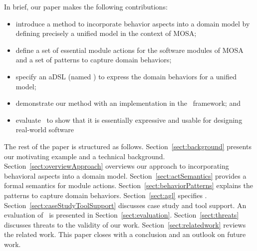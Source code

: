 In brief, our paper makes the following contributions:
%
\begin{itemize}[leftmargin=*]
	\item introduce a method to incorporate behavior aspects into a domain model by defining precisely a unified model in the context of MOSA;
	\item define a set of essential module actions for the software modules of MOSA and a set of patterns to capture domain behaviors;
	\item specify an aDSL (named \agl) to express the domain behaviors for a unified model;
	\item demonstrate our method with an implementation in the \jdomainapp~framework; and
  \item evaluate \agl~to show that it is essentially expressive and usable for designing real-world software
\end{itemize}

The rest of the paper is structured as follows. Section~\ref{sect:background} presents our motivating example and a technical background. 
Section~\ref{sect:overviewApproach} overviews our approach to incorporating behavioral aspects into a domain model. 
Section~\ref{sect:actSemantics} provides a formal semantics for module actions. Section~\ref{sect:behaviorPatterns} explains the patterns to capture domain behaviors.  
Section~\ref{sect:agl} specifies \agl. 
Section~\ref{sect:caseStudyToolSupport} discusses case study and tool support.
An evaluation of \agl~is presented in Section~\ref{sect:evaluation}. Section~\ref{sect:threats} discusses threats to the validity of our work.
Section~\ref{sect:relatedwork} reviews the related work. This paper closes with a conclusion and an outlook on future work.
